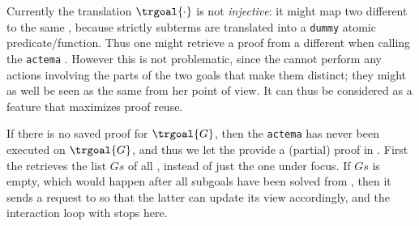 \begin{remark}
  Currently the translation $\trgoal{\cdot}$ is not \emph{injective}: it might
  map two different   to the same  ,
  because strictly  subterms are translated into a
  \texttt{dummy} atomic predicate/function. Thus one might retrieve a proof from
  a different  when calling the \texttt{actema} . However
  this is not problematic, since the  cannot perform any actions
  involving the parts of the two goals that make them distinct; they might as
  well be seen as the same  from her point of view. It can thus be
  considered as a feature that maximizes proof reuse.
\end{remark}

If there is no saved proof for $\trgoal{G}$, then the \texttt{actema}
 has never been executed on $\trgoal{G}$, and thus we let the
 provide a (partial) proof in . First the
 retrieves the list $Gs$ of all , instead of just
the one under focus. If $Gs$ is empty, which would happen after all subgoals
have been solved from , then it sends a  request to
 so that the latter can update its view accordingly, and the
interaction loop with  stops here.

